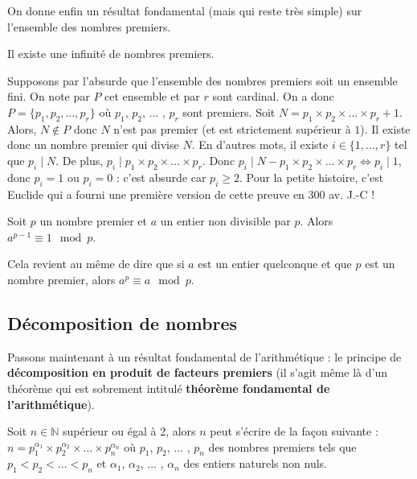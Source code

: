 	On donne enfin un résultat fondamental (mais qui reste très simple) sur l'ensemble des nombres premiers.

	\begin{formula}
		Il existe une infinité de nombres premiers.
	\end{formula}

	\begin{demonstration}
		Supposons par l'absurde que l'ensemble des nombres premiers soit un ensemble fini. On note par $P$ cet ensemble et par $r$ sont cardinal. On a donc $P = \{p_1, p_2, \dots, p_r\}$ où $p_1$, $p_2$, ... , $p_r$ sont premiers. \newpar
		Soit $N = p_1 \times p_2 \times \dots \times p_r + 1$. Alors, $N \notin P$ donc $N$ n'est pas premier (et est strictement supérieur à $1$). Il existe donc un nombre premier qui divise $N$.
		\newpar
		En d'autres mots, il existe $i \in \{1, \dots, r\}$ tel que $p_i \mid N$. De plus, $p_i \mid p_1 \times p_2 \times \dots \times p_r$.
		\newpar
		Donc $p_i \mid N -  p_1 \times p_2 \times \dots \times p_r \iff p_i \mid 1$, donc $p_i = 1$ ou $p_i = 0$ : c'est absurde car $p_i \geq 2$.
		\newpar
		Pour la petite histoire, c'est Euclide qui a fourni une première version de cette preuve en 300 av. J.-C !
	\end{demonstration}

	\begin{formula}
		\label{thm:fermat}
		Soit $p$ un nombre premier et $a$ un entier non divisible par $p$. Alors $a^{p-1} \equiv 1 \mod p$.
	\end{formula}

	\begin{tip}
		Cela revient au même de dire que si $a$ est un entier quelconque et que $p$ est un nombre premier, alors $a^p \equiv a \mod p$.
	\end{tip}

	\subsection{Décomposition de nombres}

	Passons maintenant à un résultat fondamental de l'arithmétique : le principe de \textbf{décomposition en produit de facteurs premiers} (il s'agit même là d'un théorème qui est sobrement intitulé \textbf{théorème fondamental de l'arithmétique}).

	\begin{formula}
		Soit $n \in \mathbb{N}$ supérieur ou égal à 2, alors $n$ peut s'écrire de la façon suivante :
		\newpar
		$n = p_{1}^{\alpha_1} \times p_{2}^{\alpha_2} \times \dots \times p_{n}^{\alpha_n}$
		\newpar
		où $p_1$, $p_2$, ... , $p_n$ des nombres premiers tels que $p_1 \lt p_2 \lt \dots \lt p_n$ et $\alpha_1$, $\alpha_2$, ... , $\alpha_n$ des entiers naturels non nuls.
	\end{formula}

